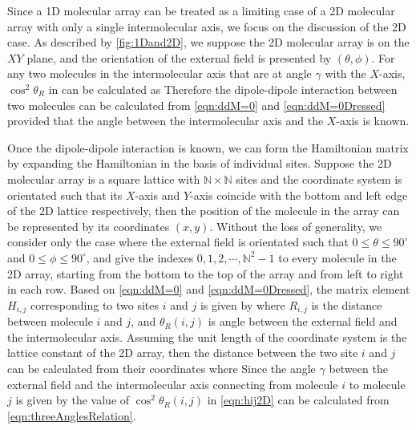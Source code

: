 Since a 1D molecular array can be treated as a limiting case of a 2D molecular array with only a single intermolecular
 axis, we focus on the discussion of the 2D case. As described by \autoref{fig:1Dand2D}, we suppose the 2D molecular 
array is on the $XY$ plane, and the orientation of the external field is presented by $(\theta, \phi)$. For any two 
molecules in the intermolecular axis that are at angle $\gamma$ with the $X$-axis, $\cos^2\theta_{R}$ in
 can be calculated as
Therefore the dipole-dipole interaction between two molecules can be calculated from \autoref{eqn:ddM=0} and
 \autoref{eqn:ddM=0Dressed} provided that the angle between the intermolecular axis and the $X$-axis is known. 


Once the dipole-dipole interaction is known, we can form the Hamiltonian matrix by expanding the Hamiltonian in 
the basis of individual sites. Suppose the 2D molecular array is a square lattice with $\mathbb{N}\times\mathbb{N}$
sites and the coordinate system is orientated such that its $X$-axis and $Y$-axis coincide with the
bottom and left edge of the 2D lattice respectively, then the position of the
molecule in the array can be represented by its coordinates $(x, y)$. Without the loss of generality, we consider only 
the case where the external field is orientated such that $0\le \theta\le 90^\circ$ and $0 \le \phi \le 90^\circ$, and
give the indexes $0, 1, 2, \cdots, \mathbb{N}^2-1$ to every molecule in the 2D array, starting from the bottom to 
the top of the array and from left to right in each row. Based on \autoref{eqn:ddM=0} and
 \autoref{eqn:ddM=0Dressed},  the matrix element $H_{i,j}$ corresponding to two sites $i$ and $j$ is given by
where $R_{i,j}$ is the distance between molecule $i$ and $j$, and $\theta_{R}(i,j)$ is angle between the external field
and the intermolecular axis. Assuming the unit length of the coordinate system is the lattice constant of the 2D array,
then the distance between the two site $i$ and $j$ can be calculated from their coordinates
where
Since the angle $\gamma$ between the external field and the 
intermolecular axis connecting from molecule $i$ to molecule $j$ is given by
the value of $\cos^2\theta_{R}(i,j)$ in \autoref{eqn:hij2D} can be calculated from \autoref{eqn:threeAnglesRelation}.


